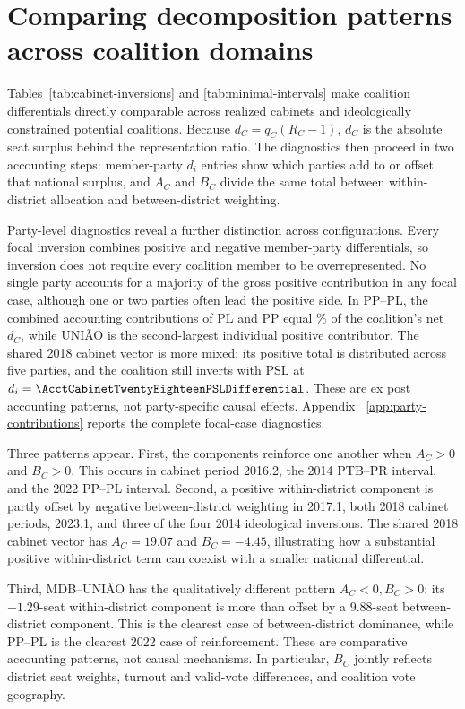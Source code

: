 \documentclass[11pt]{article}
\begin{document}
\section{Comparing decomposition patterns across coalition domains}
\label{sec:decomposition}

Tables~\ref{tab:cabinet-inversions} and \ref{tab:minimal-intervals} make
coalition differentials directly comparable across realized cabinets and
ideologically constrained potential coalitions. Because \(d_C=q_C(R_C-1)\),
\(d_C\) is the absolute seat surplus behind the representation ratio. The
diagnostics then proceed in two accounting steps: member-party \(d_i\) entries
show which parties add to or offset that national surplus, and \(A_C\) and
\(B_C\) divide the same total between within-district allocation and
between-district weighting.

Party-level diagnostics reveal a further distinction across configurations.
Every focal inversion combines positive and negative member-party
differentials, so inversion does not require every coalition member to be
overrepresented. No single party accounts for a majority of the gross positive
contribution in any focal case, although one or two parties often lead the
positive side. In PP--PL, the combined accounting contributions of PL and PP
equal \AcctPPPLPLPPSharePct\% of the coalition's net \(d_C\), while UNIÃO is
the second-largest individual positive contributor. The shared 2018 cabinet
vector is more mixed: its positive total is distributed across five parties,
and the coalition still inverts with PSL at
\(d_i=\AcctCabinetTwentyEighteenPSLDifferential\). These are ex post
accounting patterns, not party-specific causal effects. Appendix~
\ref{app:party-contributions} reports the complete focal-case diagnostics.

Three patterns appear. First, the components reinforce one another when
\(A_C>0\) and \(B_C>0\). This occurs in cabinet period 2016.2, the 2014
PTB--PR interval, and the 2022 PP--PL interval. Second, a positive
within-district component is partly
offset by negative between-district weighting in 2017.1, both 2018 cabinet
periods, 2023.1, and three of the four 2014 ideological inversions. The shared
2018 cabinet vector has \(A_C=19.07\) and \(B_C=-4.45\), illustrating how a
substantial positive within-district term can coexist with a smaller national
differential.

Third, MDB--UNIÃO has the qualitatively different pattern
\(A_C<0,B_C>0\): its \(-1.29\)-seat within-district component is more than
offset by a \(9.88\)-seat between-district component. This is the clearest case
of between-district dominance, while PP--PL is the clearest 2022 case of
reinforcement. These are comparative accounting patterns, not causal
mechanisms. In particular, \(B_C\) jointly reflects district seat weights,
turnout and valid-vote differences, and coalition vote geography.
\end{document}
